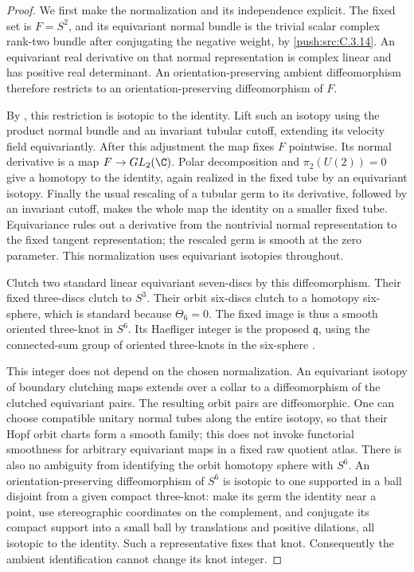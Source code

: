 \begin{proof}
We first make the normalization and its independence explicit.
The fixed set is $F=S^2$, and its equivariant normal bundle is
the trivial scalar complex rank-two bundle after conjugating
the negative weight, by \ref{push:src:C.3.14}. An equivariant real derivative
on that normal representation is complex linear and has
positive real determinant. An orientation-preserving ambient
diffeomorphism therefore restricts to an orientation-preserving
diffeomorphism of $F$.

By \citet[Theorem A, page 621]{Smale1959E}, this restriction is
isotopic to the identity. Lift such an isotopy using the product
normal bundle and an invariant tubular cutoff, extending its
velocity field equivariantly. After this adjustment the map
fixes $F$ pointwise. Its normal derivative is a map
$F\to GL_2(\C)$. Polar decomposition and $\pi_2(U(2))=0$
give a homotopy to the identity, again realized in the fixed
tube by an equivariant isotopy. Finally the usual rescaling
of a tubular germ to its derivative, followed by an invariant
cutoff, makes the whole map the identity on a smaller fixed
tube. Equivariance rules out a derivative from the nontrivial
normal representation to the fixed tangent representation;
the rescaled germ is smooth at the zero parameter. This
normalization uses equivariant isotopies throughout.

Clutch two standard linear equivariant seven-discs by this
diffeomorphism. Their fixed three-discs clutch to $S^3$.
Their orbit six-discs clutch to a homotopy six-sphere, which
is standard because $\Theta_6=0$. The fixed image is thus a
smooth oriented three-knot in $S^6$. Its Haefliger integer is
the proposed $\mathfrak q$, using the connected-sum group of
oriented three-knots in the six-sphere
\citep[Sections 1 and 5.16]{Haefliger1966D}.

This integer does not depend on the chosen normalization.
An equivariant isotopy of boundary clutching maps extends
over a collar to a diffeomorphism of the clutched equivariant
pairs. The resulting orbit pairs are diffeomorphic. One can
choose compatible unitary normal tubes along the entire
isotopy, so that their Hopf orbit charts form a smooth family;
this does not invoke functorial smoothness for arbitrary
equivariant maps in a fixed raw quotient atlas.
There is also no ambiguity from identifying the orbit homotopy
sphere with $S^6$. An orientation-preserving diffeomorphism of
$S^6$ is isotopic to one supported in a ball disjoint from a
given compact three-knot: make its germ the identity near a
point, use stereographic coordinates on the complement, and
conjugate its compact support into a small ball by translations
and positive dilations, all isotopic to the identity. Such a
representative fixes that knot. Consequently the ambient
identification cannot change its knot integer.


\end{proof}
